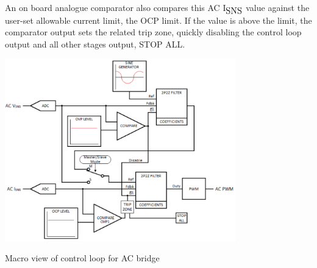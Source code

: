 An on board analogue comparator also compares this A\-C I$_{\mbox{S\-N\-S}}$  value against the user-\/set allowable current limit, the O\-C\-P limit. If the value is above the limit, the comparator output sets the related trip zone, quickly disabling the control loop output and all other stages output, S\-T\-O\-P A\-L\-L.


\begin{DoxyImage}
\includegraphics[width=10cm]{ac_bridge_loop_R2}
\caption{Macro view of control loop for A\-C bridge}
\end{DoxyImage}
 